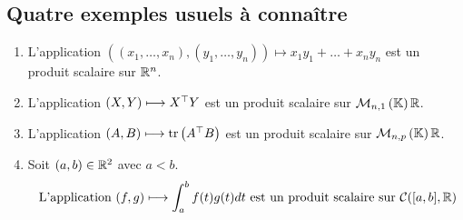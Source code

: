 \subsection{Quatre exemples usuels à connaître}
\begin{defprop}
    \begin{enumerate}
        \item L’application \(((x_1, \dots , x_n), (y_1, \dots , y_n)) \mapsto x_1y_1 + \dots + x_ny_n\) est un produit scalaire sur \(\mathbb{R}^n\).
        \item L’application \((X, Y ) \longmapsto X^{\top}Y\) est un produit scalaire sur \(\M{n,1}{\R}\).
        \item L’application \((A, B) \longmapsto \operatorname{tr} \left(A^{\top}B\right)\) est un produit scalaire sur \(\M{n,p}{\R}\).
        \item Soit \((a, b) \in \mathbb{R}^2\) avec \(a < b\).
            \[ \text{ L’application }(f, g) \longmapsto \int^b_a f (t)g(t) dt \text{ est un produit scalaire sur } \mathcal{C}([a, b] , \mathbb{R})\]
    \end{enumerate}
\end{defprop}
